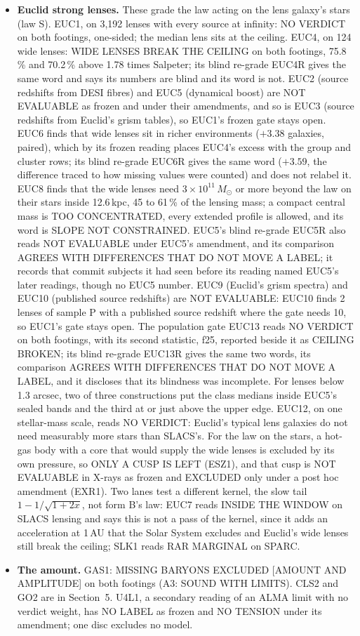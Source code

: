 \documentclass[10pt]{article}
\begin{document}
\begin{itemize}
\item \textbf{Euclid strong lenses.} These grade the law acting on the lens galaxy's stars (law S). EUC1, on 3,192 lenses with every source at infinity: NO VERDICT on both footings, one-sided; the median lens sits at the ceiling. EUC4, on 124 wide lenses: WIDE LENSES BREAK THE CEILING on both footings, 75.8\,\% and 70.2\,\% above 1.78 times Salpeter; its blind re-grade EUC4R gives the same word and says its numbers are blind and its word is not. EUC2 (source redshifts from DESI fibres) and EUC5 (dynamical boost) are NOT EVALUABLE as frozen and under their amendments, and so is EUC3 (source redshifts from Euclid's grism tables), so EUC1's frozen gate stays open. EUC6 finds that wide lenses sit in richer environments ($+3.38$ galaxies, paired), which by its frozen reading places EUC4's excess with the group and cluster rows; its blind re-grade EUC6R gives the same word ($+3.59$, the difference traced to how missing values were counted) and does not relabel it. EUC8 finds that the wide lenses need $3\times10^{11}\,M_\odot$ or more beyond the law on their stars inside 12.6\,kpc, 45 to 61\,\% of the lensing mass; a compact central mass is TOO CONCENTRATED, every extended profile is allowed, and its word is SLOPE NOT CONSTRAINED. EUC5's blind re-grade EUC5R also reads NOT EVALUABLE under EUC5's amendment, and its comparison AGREES WITH DIFFERENCES THAT DO NOT MOVE A LABEL; it records that commit subjects it had seen before its reading named EUC5's later readings, though no EUC5 number. EUC9 (Euclid's grism spectra) and EUC10 (published source redshifts) are NOT EVALUABLE: EUC10 finds 2 lenses of sample P with a published source redshift where the gate needs 10, so EUC1's gate stays open. The population gate EUC13 reads NO VERDICT on both footings, with its second statistic, f25, reported beside it as CEILING BROKEN; its blind re-grade EUC13R gives the same two words, its comparison AGREES WITH DIFFERENCES THAT DO NOT MOVE A LABEL, and it discloses that its blindness was incomplete. For lenses below 1.3 arcsec, two of three constructions put the class medians inside EUC5's sealed bands and the third at or just above the upper edge. EUC12, on one stellar-mass scale, reads NO VERDICT: Euclid's typical lens galaxies do not need measurably more stars than SLACS's. For the law on the stars, a hot-gas body with a core that would supply the wide lenses is excluded by its own pressure, so ONLY A CUSP IS LEFT (ESZ1), and that cusp is NOT EVALUABLE in X-rays as frozen and EXCLUDED only under a post hoc amendment (EXR1). Two lanes test a different kernel, the slow tail $1-1/\sqrt{1+2x}$, not form B's law: EUC7 reads INSIDE THE WINDOW on SLACS lensing and says this is not a pass of the kernel, since it adds an acceleration at 1\,AU that the Solar System excludes and Euclid's wide lenses still break the ceiling; SLK1 reads RAR MARGINAL on SPARC.
\item \textbf{The amount.} GAS1: MISSING BARYONS EXCLUDED [AMOUNT AND AMPLITUDE] on both footings (A3: SOUND WITH LIMITS). CLS2 and GO2 are in Section~5. U4L1, a secondary reading of an ALMA limit with no verdict weight, has NO LABEL as frozen and NO TENSION under its amendment; one disc excludes no model.
\end{itemize}
\end{document}
